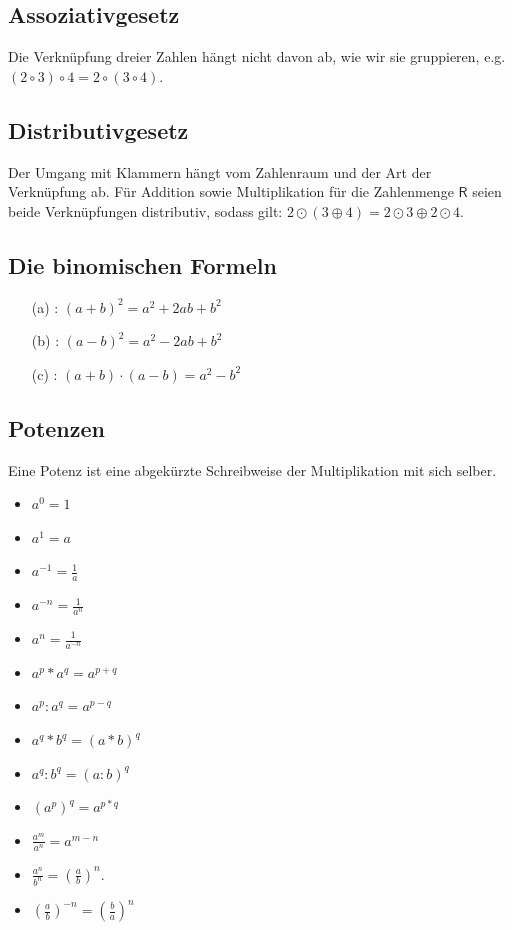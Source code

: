 \documentclass[letterpaper, titlepage]{article}
\begin{document}
\subsection{Assoziativgesetz}\label{Assoziativgesetz}
Die Verknüpfung dreier Zahlen hängt nicht davon ab, wie wir sie gruppieren, e.g. $(2 \circ 3) \circ 4 = 2 \circ (3 \circ 4)$. 

\vspace{0.35cm}

\subsection{Distributivgesetz}\label{Distributivgesetz}
Der Umgang mit Klammern hängt vom Zahlenraum und der Art der Verknüpfung ab. Für Addition sowie Multiplikation für die Zahlenmenge $\mathsf{R}$ seien beide Verknüpfungen distributiv, sodass gilt: $2\odot (3\oplus 4)=2\odot 3\oplus 2\odot 4$. \hfill \break

\vspace{0.35cm}

\subsection{Die binomischen Formeln}
\begin{enumerate}
    \item[(a)]: $(a+b)^2=a^2+2ab+b^2$
    \item[(b)]: $(a-b)^2=a^2-2ab+b^2$
    \item[(c)]: $(a+b)\cdot(a-b)=a^2-b^2$
\end{enumerate}

\vspace{0.35cm}

\subsection{Potenzen}\label{Potenzen}
Eine Potenz ist eine abgekürzte Schreibweise der Multiplikation mit sich selber.
\begin{itemize}
    \item $a^0=1$
    \item $a^1=a$
    \item $a^{-1}=\frac{1}{a}$ 
    \item $a^{-n}=\frac{1}{a^n}$
    \item $a^n=\frac{1}{a^{-n}}$
    \item $a^p * a^q = a^{p+q}$
    \item $a^p : a^q = a^{p-q}$
    \item $a^q * b^q = (a * b)^q$
    \item $a^q : b^q = (a : b)^q$
    \item $(a^p)^q = a^{p*q}$
    \item $\frac{a^m}{a^n}=a^{m-n}$
    \item $\frac{a^n}{b^n}=(\frac{a}{b})^n$.
    \item $(\frac{a}{b})^{-n}=(\frac{b}{a})^n$ 
\end{itemize}
\end{document}
